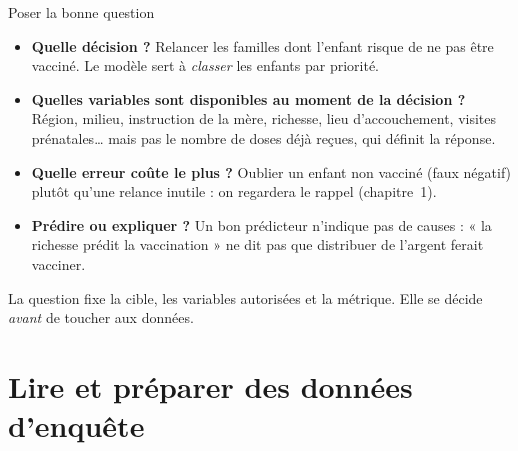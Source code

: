 \documentclass[aspectratio=169,11pt]{beamer}
\begin{document}
\begin{frame}{Poser la bonne question}
  \begin{itemize}
    \item \textbf{Quelle décision ?} Relancer les familles dont l'enfant risque de ne pas être vacciné. Le modèle sert à \emph{classer} les enfants par priorité.
    \item \textbf{Quelles variables sont disponibles au moment de la décision ?} Région, milieu, instruction de la mère, richesse, lieu d'accouchement, visites prénatales\dots{} mais pas le nombre de doses déjà reçues, qui définit la réponse.
    \item \textbf{Quelle erreur coûte le plus ?} Oublier un enfant non vacciné (faux négatif) plutôt qu'une relance inutile : on regardera le rappel (chapitre~1).
    \item \textbf{Prédire ou expliquer ?} Un bon prédicteur n'indique pas de causes : « la richesse prédit la vaccination » ne dit pas que distribuer de l'argent ferait vacciner.
  \end{itemize}
  \begin{aretenir}
    La question fixe la cible, les variables autorisées et la métrique. Elle se décide \emph{avant} de toucher aux données.
  \end{aretenir}
\end{frame}

\section{Lire et préparer des données d'enquête}
\end{document}
